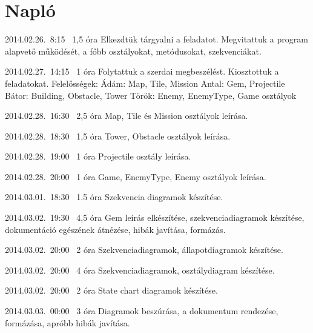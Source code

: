 %
\section{Napló}

\begin{naplo}

\bejegyzes
{2014.02.26.~8:15~} %
{1,5 óra} %
{\vadam\newline
\vantal\newline
\vbator\newline
\vtorok}
{Elkezdtük tárgyalni a feladatot. Megvitattuk a program alapvető működését, a főbb osztályokat, metódusokat, szekvenciákat.}

\bejegyzes
{2014.02.27.~14:15~}
{1 óra}
{\vadam\newline
\vantal\newline
\vbator\newline
\vtorok}
{Folytattuk a szerdai megbeszélést. Kiosztottuk a feladatokat. \newline Felelősségek: \newline
Ádám: Map, Tile, Mission \newline
Antal: Gem, Projectile \newline
Bátor: Building, Obstacle, Tower \newline
Török: Enemy, EnemyType, Game \newline osztályok}

\bejegyzes
{2014.02.28.~16:30~}
{2,5 óra}
{\vadam}
{Map, Tile és Mission osztályok leírása.}

\bejegyzes
{2014.02.28.~18:30~}
{1,5 óra}
{\vbator}
{Tower, Obstacle osztályok leírása.}

\bejegyzes
{2014.02.28.~19:00~}
{1 óra}
{\vantal}
{Projectile osztály leírása.}

\bejegyzes
{2014.02.28.~20:00~}
{1 óra}
{\vtorok}
{Game, EnemyType, Enemy osztályok leírása.}

\bejegyzes
{2014.03.01.~18:30~}
{1.5 óra}
{\vadam}
{Szekvencia diagramok készítése.}

\bejegyzes
{2014.03.02.~19:30~}
{4,5 óra}
{\vantal}
{Gem leírás elkészítése, szekvenciadiagramok készítése, dokumentáció egészének átnézése, hibák javítása, formázás.}

\bejegyzes
{2014.03.02.~20:00~}
{2 óra}
{\vadam}
{Szekvenciadiagramok, állapotdiagramok készítése.}

\bejegyzes
{2014.03.02.~20:00~}
{4 óra}
{\vbator}
{Szekvenciadiagramok, osztálydiagram készítése.}

\bejegyzes
{2014.03.02.~20:00~}
{2 óra}
{\vadam}
{State chart diagramok készítése.}

\bejegyzes
{2014.03.03.~00:00~}
{3 óra}
{\vtorok}
{Diagramok beszúrása, a dokumentum rendezése, formázása, apróbb hibák javítása.}

\end{naplo}

